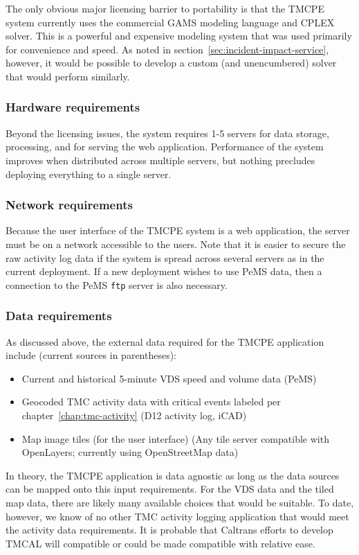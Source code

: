 \documentclass[12pt]{report}
\begin{document}
The only obvious major licensing barrier to portability is that the \ac{TMCPE}
system currently uses the commercial \ac{GAMS} modeling language and \ac{CPLEX}
solver.  This is a powerful and expensive modeling system that was used
primarily for convenience and speed.  As noted in
section~\ref{sec:incident-impact-service}, however, it would be possible to
develop a custom (and unencumbered) solver that would perform similarly.

\subsubsection{Hardware requirements}
\label{sec:portability-hardware}

Beyond the licensing issues, the system requires 1-5 servers for data storage,
processing, and for serving the web application.  Performance of the system
improves when distributed across multiple servers, but nothing precludes
deploying everything to a single server.  

\subsubsection{Network requirements}
\label{sec:portability-network}

Because the user interface of the \ac{TMCPE} system is a web application, the
server must be on a network accessible to the users.  Note that it is easier to
secure the raw activity log data if the system is spread across several servers
as in the current deployment.  If a new deployment wishes to use \ac{PeMS} data,
then a connection to the \ac{PeMS} \texttt{ftp} server is also necessary.

\subsubsection{Data requirements}
\label{sec:portability-data}

As discussed above, the external data required for the \ac{TMCPE} application
include (current sources in parentheses):
\begin{itemize}
\item Current and historical 5-minute \ac{VDS} speed and volume data (\ac{PeMS})
\item Geocoded \ac{TMC} activity data with critical events labeled per
  chapter~\ref{chap:tmc-activity} (\ac{D12} activity log, \ac{iCAD})
\item Map image tiles (for the user interface) (Any tile server compatible with
  OpenLayers; currently using OpenStreetMap data)
\end{itemize}
In theory, the \ac{TMCPE} application is data agnostic as long as the data
sources can be mapped onto this input requirements.  For the \ac{VDS} data and
the tiled map data, there are likely many available choices that would be
suitable.  To date, however, we know of no other \ac{TMC} activity logging
application that would meet the activity data requirements.  It is probable that
Caltrans efforts to develop \ac{TMCAL} will compatible or could be made
compatible with relative ease.
\end{document}
